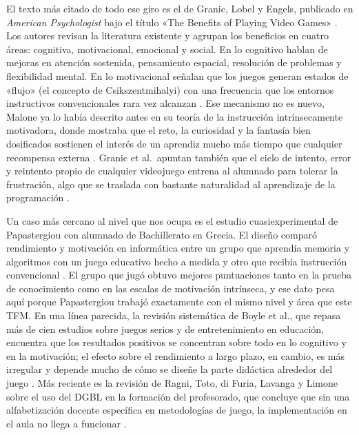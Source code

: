 \documentclass[a4paper,12pt]{article}
\begin{document}
El texto más citado de todo ese giro es el de Granic, Lobel y Engels, publicado en \textit{American Psychologist} bajo el título «The Benefits of Playing Video Games» \citep{granic2014benefits}. Los autores revisan la literatura existente y agrupan los beneficios en cuatro áreas: cognitiva, motivacional, emocional y social. En lo cognitivo hablan de mejoras en atención sostenida, pensamiento espacial, resolución de problemas y flexibilidad mental. En lo motivacional señalan que los juegos generan estados de «flujo» (el concepto de Csikszentmihalyi) con una frecuencia que los entornos instructivos convencionales rara vez alcanzan \citep{csikszentmihalyi1990flow}. Ese mecanismo no es nuevo, Malone ya lo había descrito antes en su teoría de la instrucción intrínsecamente motivadora, donde mostraba que el reto, la curiosidad y la fantasía bien dosificados sostienen el interés de un aprendiz mucho más tiempo que cualquier recompensa externa \citep{malone1981intrinsic}. Granic et al.\ apuntan también que el ciclo de intento, error y reintento propio de cualquier videojuego entrena al alumnado para tolerar la frustración, algo que se traslada con bastante naturalidad al aprendizaje de la programación \citep{granic2014benefits}.

Un caso más cercano al nivel que nos ocupa es el estudio cuasiexperimental de Papastergiou con alumnado de Bachillerato en Grecia. El diseño comparó rendimiento y motivación en informática entre un grupo que aprendía memoria y algoritmos con un juego educativo hecho a medida y otro que recibía instrucción convencional \citep{papastergiou2009digital}. El grupo que jugó obtuvo mejores puntuaciones tanto en la prueba de conocimiento como en las escalas de motivación intrínseca, y ese dato pesa aquí porque Papastergiou trabajó exactamente con el mismo nivel y área que este TFM. En una línea parecida, la revisión sistemática de Boyle et al., que repasa más de cien estudios sobre juegos serios y de entretenimiento en educación, encuentra que los resultados positivos se concentran sobre todo en lo cognitivo y en la motivación; el efecto sobre el rendimiento a largo plazo, en cambio, es más irregular y depende mucho de cómo se diseñe la parte didáctica alrededor del juego \citep{boyle2016systematic}. Más reciente es la revisión de Ragni, Toto, di Furia, Lavanga y Limone sobre el uso del DGBL en la formación del profesorado, que concluye que sin una alfabetización docente específica en metodologías de juego, la implementación en el aula no llega a funcionar \citep{frontiers2023dgbl}.
\end{document}
